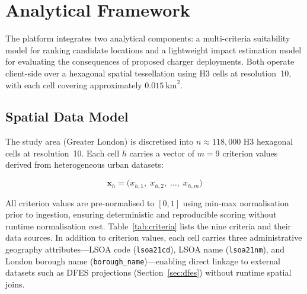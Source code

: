 
\section{Analytical Framework}
\label{sec:methodology}

The platform integrates two analytical components: a multi-criteria suitability model for ranking candidate locations and a lightweight impact estimation model for evaluating the consequences of proposed charger deployments. Both operate client-side over a hexagonal spatial tessellation using H3 cells at resolution~10, with each cell covering approximately $0.015~\text{km}^2$.

\subsection{Spatial Data Model}
\label{sec:spatial-data}

The study area (Greater London) is discretised into $n \approx 118{,}000$ H3 hexagonal cells at resolution~10. Each cell $h$ carries a vector of $m = 9$ criterion values derived from heterogeneous urban datasets:

\begin{equation}
\mathbf{x}_h = \bigl(x_{h,1},\; x_{h,2},\; \ldots,\; x_{h,m}\bigr)
\end{equation}

\noindent All criterion values are pre-normalised to $[0, 1]$ using min-max normalisation prior to ingestion, ensuring deterministic and reproducible scoring without runtime normalisation cost. Table~\ref{tab:criteria} lists the nine criteria and their data sources. In addition to criterion values, each cell carries three administrative geography attributes---LSOA code (\texttt{lsoa21cd}), LSOA name (\texttt{lsoa21nm}), and London borough name (\texttt{borough\_name})---enabling direct linkage to external datasets such as DFES projections (Section~\ref{sec:dfes}) without runtime spatial joins.

